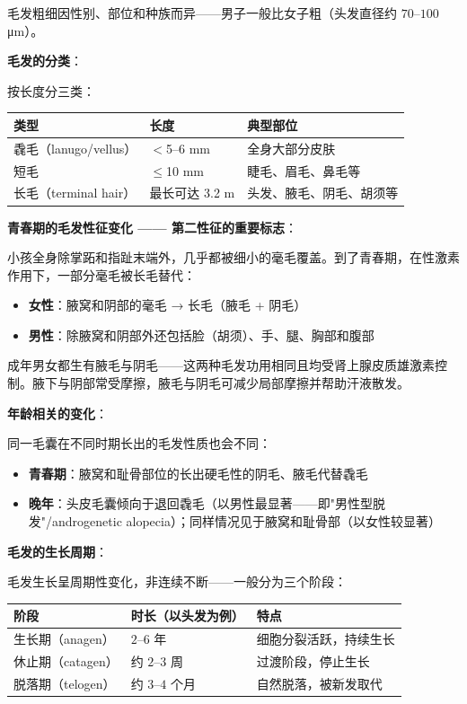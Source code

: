 毛发粗细因性别、部位和种族而异——男子一般比女子粗（头发直径约 $70$--$100$ μm）。

\vspace{0.5em}
\noindent\textbf{毛发的分类}：

按长度分三类：
\begin{center}\small
\begin{tabular}{|l|l|p{6cm}|}
\hline
类型 & 长度 & 典型部位 \\
\hline
毳毛（lanugo/vellus） & $<$5--6 mm & 全身大部分皮肤 \\
短毛 & $\leq$10 mm & 睫毛、眉毛、鼻毛等 \\
长毛（terminal hair）& 最长可达 3.2 m & 头发、腋毛、阴毛、胡须等 \\
\hline
\end{tabular}
\end{center}

\vspace{0.5em}
\noindent\textbf{青春期的毛发性征变化 —— 第二性征的重要标志}：

小孩全身除掌跖和指趾末端外，几乎都被细小的毫毛覆盖。到了青春期，在性激素作用下，一部分毫毛被长毛替代：
\begin{itemize}
	\item \textbf{女性}：腋窝和阴部的毫毛 → 长毛（腋毛 + 阴毛）
	\item \textbf{男性}：除腋窝和阴部外还包括脸（胡须）、手、腿、胸部和腹部
\end{itemize}

成年男女都生有腋毛与阴毛——这两种毛发功用相同且均受肾上腺皮质雄激素控制。腋下与阴部常受摩擦，腋毛与阴毛可减少局部摩擦并帮助汗液散发。

\vspace{0.5em}
\noindent\textbf{年龄相关的变化}：

同一毛囊在不同时期长出的毛发性质也会不同：
\begin{itemize}
	\item \textbf{青春期}：腋窝和耻骨部位的长出硬毛性的阴毛、腋毛代替毳毛
	\item \textbf{晚年}：头皮毛囊倾向于退回毳毛（以男性最显著——即"男性型脱发"/androgenetic alopecia）；同样情况见于腋窝和耻骨部（以女性较显著）
\end{itemize}

\vspace{0.5em}
\noindent\textbf{毛发的生长周期}：

毛发生长呈周期性变化，非连续不断——一般分为三个阶段：

\begin{center}\small
\begin{tabular}{|l|p{4cm}|p{5cm}|}
\hline
阶段 & 时长（以头发为例） & 特点 \\
\hline
生长期（anagen） & $2$--$6$ 年 & 细胞分裂活跃，持续生长 \\
休止期（catagen） & 约 $2$--$3$ 周 & 过渡阶段，停止生长 \\
脱落期（telogen） & 约 $3$--$4$ 个月 & 自然脱落，被新发取代 \\
\hline
\end{tabular}
\end{center}

